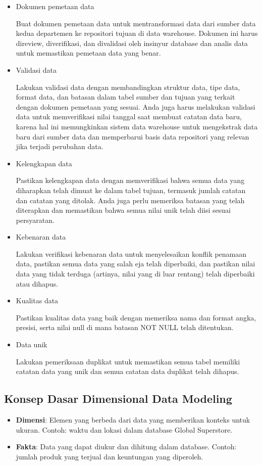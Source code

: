 \documentclass{article}
\begin{document}
\begin{itemize}
    \item Dokumen pemetaan data

          Buat dokumen pemetaan data untuk mentransformasi data dari sumber data kedua departemen ke repositori tujuan di data warehouse. Dokumen ini harus direview, diverifikasi, dan divalidasi oleh insinyur database dan analis data untuk memastikan pemetaan data yang benar.

    \item Validasi data

          Lakukan validasi data dengan membandingkan struktur data, tipe data, format data, dan batasan dalam tabel sumber dan tujuan yang terkait dengan dokumen pemetaan yang sesuai. Anda juga harus melakukan validasi data untuk memverifikasi nilai tanggal saat membuat catatan data baru, karena hal ini memungkinkan sistem data warehouse untuk mengekstrak data baru dari sumber data dan memperbarui basis data repositori yang relevan jika terjadi perubahan data.

    \item Kelengkapan data

          Pastikan kelengkapan data dengan memverifikasi bahwa semua data yang diharapkan telah dimuat ke dalam tabel tujuan, termasuk jumlah catatan dan catatan yang ditolak. Anda juga perlu memeriksa batasan yang telah diterapkan dan memastikan bahwa semua nilai unik telah diisi sesuai persyaratan.

    \item Kebenaran data

          Lakukan verifikasi kebenaran data untuk menyelesaikan konflik penamaan data, pastikan semua data yang salah eja telah diperbaiki, dan pastikan nilai data yang tidak terduga (artinya, nilai yang di luar rentang) telah diperbaiki atau dihapus.

    \item Kualitas data

          Pastikan kualitas data yang baik dengan memeriksa nama dan format angka, presisi, serta nilai null di mana batasan NOT NULL telah ditentukan.

    \item Data unik

          Lakukan pemeriksaan duplikat untuk memastikan semua tabel memiliki catatan data yang unik dan semua catatan data duplikat telah dihapus.
\end{itemize}

\subsection{Konsep Dasar Dimensional Data Modeling}
\begin{itemize}
    \item \textbf{Dimensi}: Elemen yang berbeda dari data yang memberikan konteks untuk ukuran. Contoh: waktu dan lokasi dalam database Global Superstore.
    \item \textbf{Fakta}: Data yang dapat diukur dan dihitung dalam database. Contoh: jumlah produk yang terjual dan keuntungan yang diperoleh.
\end{itemize}
\end{document}
